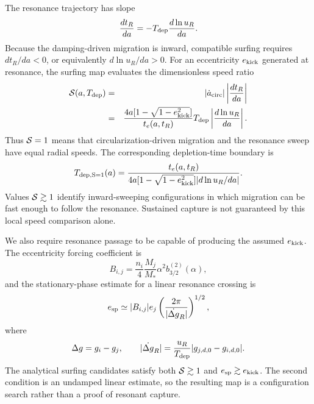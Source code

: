 The resonance trajectory has slope
\begin{equation}
    \frac{dt_R}{da}=-T_{\rm dep}\frac{d\ln u_R}{da}.
\label{eq:sr_slope}
\end{equation}
Because the damping-driven migration is inward, compatible surfing requires
$dt_R/da<0$, or equivalently $d\ln u_R/da>0$. For an eccentricity
$e_{\rm kick}$ generated at resonance, the surfing map evaluates the
dimensionless speed ratio
\begin{eqnarray}
    {\cal S}(a,T_{\rm dep})
    &=&|\dot a_{\rm circ}|
       \left|\frac{dt_R}{da}\right|
    \nonumber\\
    &=&\frac{4a[1-\sqrt{1-e_{\rm kick}^2}]}
    {t_e(a,t_R)}
    T_{\rm dep}\left|\frac{d\ln u_R}{da}\right|.
\label{eq:surfing_number}
\end{eqnarray}
Thus ${\cal S}=1$ means that circularization-driven migration and the resonance sweep
have equal radial speeds. The corresponding depletion-time boundary is
\begin{equation}
    T_{\rm dep,S=1}(a)=
    \frac{t_e(a,t_R)}
    {4a[1-\sqrt{1-e_{\rm kick}^2}]
    |d\ln u_R/da|}.
\label{eq:surfing_boundary}
\end{equation}
Values ${\cal S}\gtrsim1$ identify inward-sweeping configurations in which
migration can be fast enough to follow the resonance. Sustained capture is
not guaranteed by this local speed comparison alone.

We also require resonance passage to be capable of producing the assumed
$e_{\rm kick}$. The eccentricity forcing coefficient is
\begin{equation}
    B_{i,j}=\frac{n_i}{4}\frac{M_j}{M_*}
    \alpha^2b_{3/2}^{(2)}(\alpha),
\label{eq:secular_forcing_coefficient}
\end{equation}
and the stationary-phase estimate for a linear resonance crossing is
\begin{equation}
    e_{\rm sp}\simeq |B_{i,j}|e_j
    \left(\frac{2\pi}{|\dot{\Delta g}_R|}\right)^{1/2},
\label{eq:stationary_phase_kick}
\end{equation}
where
\begin{equation}
    \Delta g=g_i-g_j,
    \qquad
    |\dot{\Delta g}_R|
    =\frac{u_R}{T_{\rm dep}}
    |g_{j,d,0}-g_{i,d,0}|.
\label{eq:relative_precession_sweep}
\end{equation}
The analytical surfing candidates satisfy both ${\cal S}\gtrsim1$ and
$e_{\rm sp}\gtrsim e_{\rm kick}$. The second condition is an undamped
linear estimate, so the resulting map is a configuration search rather
than a proof of resonant capture.


